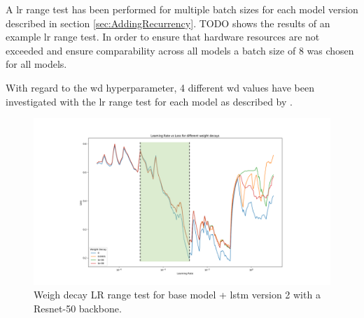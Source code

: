 \documentclass[11pt,
  paper=a4, 
  bibliography=totocnumbered,
	captions=tableheading,
	BCOR=10mm
]{scrreprt}
\theoremstyle{definition}
\def \figwidth {0.9\linewidth}
\begin{document}
A \gls{lr} range test has been performed for multiple batch sizes for each model version described in section \ref{sec:AddingRecurrency}.
TODO shows the results of an example \gls{lr} range test.
In order to ensure that hardware resources are not exceeded and ensure comparability across all models a batch size of 8 was chosen for all models. 

With regard to the \gls{wd} hyperparameter, 4 different \gls{wd} values have been investigated with the \gls{lr} range test for each model as described by \textcite{Smith2018}.


\begin{figure}[H]
	\centering
	\includegraphics[width=\figwidth]{LR_plot_res_lstm_v2}
	\caption[Weight decay learning rate range test]{
		Weigh decay LR range test for base model + lstm version 2 with a Resnet-50 backbone.
		\label{fig:WDLRtest}}
\end{figure}
\end{document}

